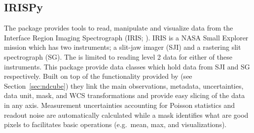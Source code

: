 \subsection{IRISPy}
\label{sec:irispy}

The  package provides tools to read, manipulate and visualize data from the Interface Region Imaging Spectrograph (IRIS; \citealt{DePontieu2014}).
IRIS is a NASA Small Explorer mission which has two instruments; a slit-jaw imager (SJI) and a rastering slit spectrograph (SG).
The  is limited to reading level 2 data for either of these instruments.
This package provide data classes which hold data from SJI and SG respectively.
Built on top of the functionality provided by  (see Section~\ref{sec:ndcube}) they link the main observations, metadata, uncertainties, data unit, mask, and WCS transformations and provide easy slicing of the data in any axis.
Measurement uncertainties accounting for Poisson statistics and readout noise are automatically calculated while a mask identifies what are good pixels to facilitates basic operations (e.g.\ mean, max, and visualizations).

